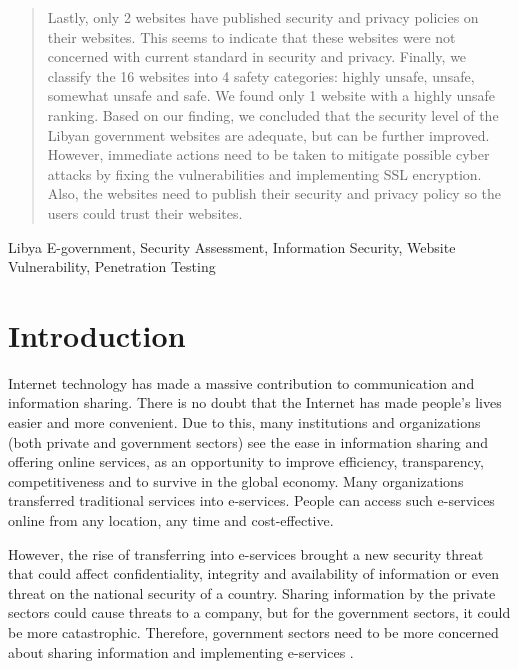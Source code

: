\documentclass[conference]{IEEEtran}
\begin{document}
\begin{abstract}
Lastly, only 2 websites have published security and privacy policies on their websites. This seems to indicate that these websites were not concerned with current standard in security and privacy. Finally, we classify the 16 websites into 4 safety categories: highly unsafe, unsafe, somewhat unsafe and safe. We found only 1 website with a highly unsafe ranking. Based on our finding, we concluded that the security level of the Libyan government websites are adequate, but can be further improved. However, immediate actions need to be taken to mitigate possible cyber attacks by fixing the vulnerabilities and implementing SSL encryption. Also, the websites need to publish their security and privacy policy so the users could trust their websites.


\end{abstract}

\begin{IEEEkeywords}
Libya E-government, Security Assessment, Information Security,
Website Vulnerability, Penetration Testing
\end{IEEEkeywords}

\section{Introduction}

Internet technology has made a massive contribution to communication
and information sharing. There is no doubt that the Internet has made
people’s lives easier and more convenient. Due to this, many
institutions and organizations (both private and government
sectors) see the ease in information sharing and offering online
services, as an opportunity to improve efficiency, transparency,
competitiveness and to survive in the global economy\cite{othman2018whole}\cite{yusof2013evaluating}. 
Many organizations
transferred traditional services into e-services. People can access such
e-services online from any location, any time and cost-effective.

However, the rise of
transferring into e-services brought a new security threat that could affect
confidentiality, integrity and availability of 
information or even threat on the national security of a country. Sharing
information by the private sectors could cause threats to a company, but for the
government sectors, it could be more catastrophic. Therefore,
government sectors need to be more concerned about sharing
information and implementing e-services\cite{zhao2010opportunities}
\cite{kasimin2013using}.
\end{document}
